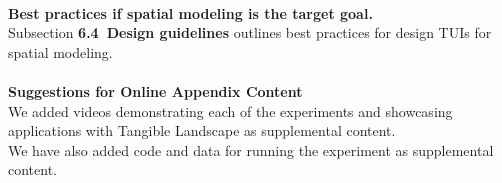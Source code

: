 \documentclass[prodmode,acmtochi]{acmsmall} %
\begin{document}
\hrulefill \\

\textbf{Best practices if spatial modeling is the target goal.}\\

Subsection \textbf{6.4~Design guidelines} outlines best practices
for design TUIs for spatial modeling. \\


\hrulefill \\

\textbf{Suggestions for Online Appendix Content} \\

We added videos demonstrating each of the experiments 
and showcasing applications with Tangible Landscape
as supplemental content.\\

We have also added code and data for running the experiment
as supplemental content.\\



%



\end{document}
